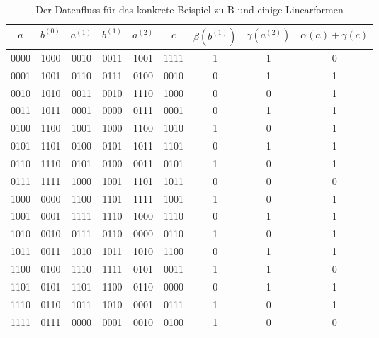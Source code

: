 \begin{refsegment}
\begin{table}
\begin{center}
\begin{tabular}{|cccccc|c|c|c|} \hline
  $a$  &$b^{(0)}$& $a^{(1)}$& $b^{(1)}$&$a^{(2)}$&$c$&$\beta(b^{(1)})$&$\gamma(a^{(2)})$&
                                                           $\alpha(a)+\gamma(c)$ \\ \hline
  0000 & 1000  & 0010  & 0011  & 1001  & 1111 &      1       &      1        & 0 \\
  0001 & 1001  & 0110  & 0111  & 0100  & 0010 &      0       &      1        & 1 \\
  0010 & 1010  & 0011  & 0010  & 1110  & 1000 &      0       &      0        & 1 \\
  0011 & 1011  & 0001  & 0000  & 0111  & 0001 &      0       &      1        & 1 \\
  0100 & 1100  & 1001  & 1000  & 1100  & 1010 &      1       &      0        & 1 \\
  0101 & 1101  & 0100  & 0101  & 1011  & 1101 &      0       &      1        & 1 \\
  0110 & 1110  & 0101  & 0100  & 0011  & 0101 &      1       &      0        & 1 \\
  0111 & 1111  & 1000  & 1001  & 1101  & 1011 &      0       &      0        & 0 \\
  1000 & 0000  & 1100  & 1101  & 1111  & 1001 &      1       &      0        & 1 \\
  1001 & 0001  & 1111  & 1110  & 1000  & 1110 &      0       &      1        & 1 \\
  1010 & 0010  & 0111  & 0110  & 0000  & 0110 &      1       &      0        & 1 \\
  1011 & 0011  & 1010  & 1011  & 1010  & 1100 &      0       &      1        & 1 \\
  1100 & 0100  & 1110  & 1111  & 0101  & 0011 &      1       &      1        & 0 \\
  1101 & 0101  & 1101  & 1100  & 0110  & 0000 &      0       &      1        & 1 \\
  1110 & 0110  & 1011  & 1010  & 0001  & 0111 &      1       &      0        & 1 \\
  1111 & 0111  & 0000  & 0001  & 0010  & 0100 &      1       &      0        & 0 \\
  \hline
\end{tabular}
\end{center}
\caption{Der Datenfluss für das konkrete Beispiel zu B und einige Linearformen}\label{tab-bool-B}
\end{table}


\end{refsegment}
